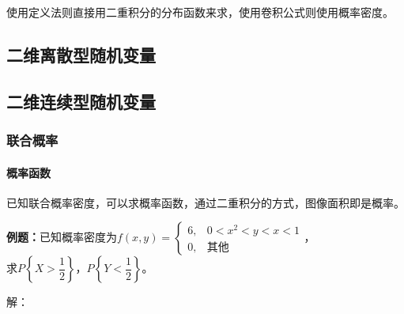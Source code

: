 \documentclass[UTF8, 12pt]{ctexart}
\begin{document}
使用定义法则直接用二重积分的分布函数来求，使用卷积公式则使用概率密度。

\subsection{二维离散型随机变量}

\subsection{二维连续型随机变量}

\subsubsection{联合概率}

\paragraph{概率函数} \leavevmode \medskip

已知联合概率密度，可以求概率函数，通过二重积分的方式，图像面积即是概率。

\textbf{例题：}已知概率密度为$f(x,y)=\left\{\begin{array}{ll}
    6, & 0<x^2<y<x<1 \\
    0, & \text{其他}
\end{array}\right.$，\\求$P\left\{X>\dfrac{1}{2}\right\}$，$P\left\{Y<\dfrac{1}{2}\right\}$。

解：
\end{document}
